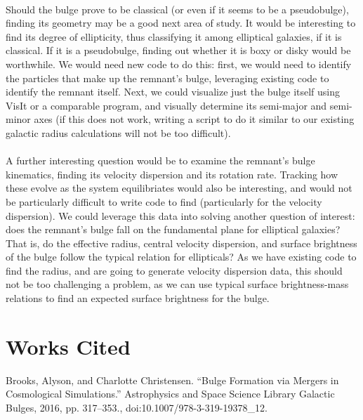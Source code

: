 \documentclass[a4paper]{article}
\begin{document}
    \paragraph{}
	
    Should the bulge prove to be classical (or even if it seems to be a pseudobulge), finding its geometry may be a good next area of study. It would be interesting to find its degree of ellipticity, thus classifying it among elliptical galaxies, if it is classical. If it is a pseudobulge, finding out whether it is boxy or disky would be worthwhile. We would need new code to do this: first, we would need to identify the particles that make up the remnant's bulge, leveraging existing code to identify the remnant itself. Next, we could visualize just the bulge itself using VisIt or a comparable program, and visually determine its semi-major and semi-minor axes (if this does not work, writing a script to do it similar to our existing galactic radius calculations will not be too difficult).
    
    \paragraph{}
    
A further interesting question would be to examine the remnant's bulge kinematics, finding its velocity dispersion and its rotation rate. Tracking how these evolve as the system equilibriates would also be interesting, and would not be particularly difficult to write code to find (particularly for the velocity dispersion). We could leverage this data into solving another question of interest: does the remnant's bulge fall on the fundamental plane for elliptical galaxies? That is, do the effective radius, central velocity dispersion, and surface brightness of the bulge follow the typical relation for ellipticals? As we have existing code to find the radius, and are going to generate velocity dispersion data, this should not be too challenging a problem, as we can use typical surface brightness-mass relations to find an expected surface brightness for the bulge. 

\section{Works Cited}

\hangindent=0.7cm{}
Brooks, Alyson, and Charlotte Christensen. “Bulge Formation via Mergers in Cosmological Simulations.” Astrophysics and Space Science Library Galactic Bulges, 2016, pp. 317–353., doi:10.1007/978-3-319-19378\_12.
\end{document}
